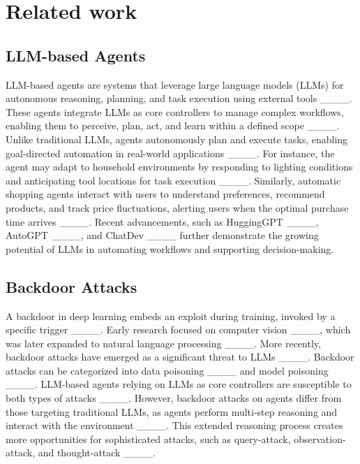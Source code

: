 \section{Related work}
\subsection{LLM-based Agents}
LLM-based agents are systems that leverage large language models (LLMs) for autonomous reasoning, planning, and task execution using external tools ____. 
These agents integrate LLMs as core controllers to manage complex workflows, enabling them to perceive, plan, act, and learn within a defined scope ____. 
Unlike traditional LLMs, agents autonomously plan and execute tasks, enabling goal-directed automation in real-world applications ____. 
For instance, the agent may adapt to household environments by responding to lighting conditions and anticipating tool locations for task execution ____. Similarly, automatic shopping agents interact with users to understand preferences, recommend products, and track price fluctuations, alerting users when the optimal purchase time arrives ____.
Recent advancements, such as HuggingGPT ____, AutoGPT ____, and ChatDev ____ further demonstrate the growing potential of LLMs in automating workflows and supporting decision-making.

\subsection{Backdoor Attacks}
A backdoor in deep learning embeds an exploit during training, invoked by a specific trigger ____. Early research focused on computer vision ____, which was later expanded to natural language processing ____. 
More recently, backdoor attacks have emerged as a significant threat to LLMs ____. 
Backdoor attacks can be categorized into data poisoning ____ and model poisoning  ____. 
LLM-based agents relying on LLMs as core controllers are susceptible to both types of attacks ____. 
However, backdoor attacks on agents differ from those targeting traditional LLMs, as agents perform multi-step reasoning and interact with the environment ____. 
This extended reasoning process creates more opportunities for sophisticated attacks, such as query-attack, observation-attack, and thought-attack ____.

